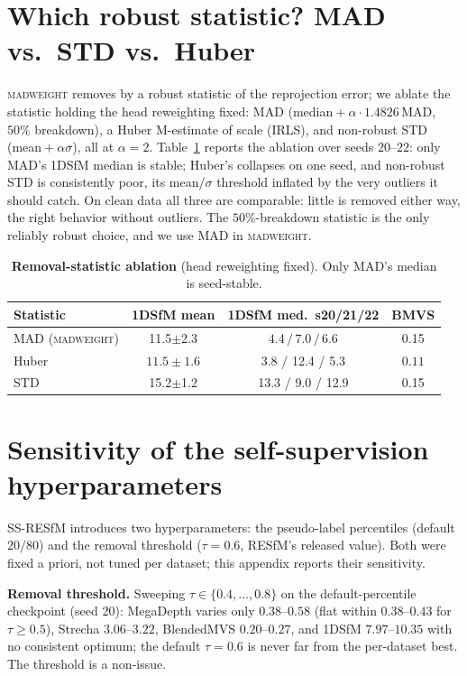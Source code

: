 \documentclass[10pt,twocolumn,letterpaper]{article}
\newcommand{\mad}{\textsc{madweight}}
\begin{document}
\section{Which robust statistic? MAD vs.\ STD vs.\ Huber}\label{app:stat}
\mad{} removes by a robust statistic of the reprojection error; we ablate the statistic
holding the head reweighting fixed: MAD (median${}+\alpha\cdot1.4826\,$MAD, $50\%$
breakdown), a Huber M-estimate of scale (IRLS), and non-robust STD
(mean${}+\alpha\sigma$), all at $\alpha{=}2$. Table~\ref{tab:madstat} reports the
ablation over seeds $20$--$22$: only MAD's 1DSfM median is stable; Huber's collapses on
one seed, and non-robust STD is consistently poor, its mean/$\sigma$ threshold inflated
by the very outliers it should catch. On clean data all three are comparable: little is
removed either way, the right behavior without outliers. The $50\%$-breakdown statistic
is the only reliably robust choice, and we use MAD in \mad{}.

\begin{table}[t]\centering\scriptsize
\setlength{\tabcolsep}{2.5pt}%
\caption{\textbf{Removal-statistic ablation} (head reweighting fixed). Only MAD's
median is seed-stable.}
\label{tab:madstat}
\begin{tabular}{lccc}
\toprule
Statistic & 1DSfM mean & 1DSfM med.\ s20/21/22 & BMVS\\
\midrule
MAD (\mad{}) & 11.5$\pm$2.3 & $\mathbf{4.4\,/\,7.0\,/\,6.6}$ & 0.15\\
Huber & $\mathbf{11.5\pm 1.6}$ & 3.8 / 12.4 / 5.3 & $\mathbf{0.11}$\\
STD & 15.2$\pm$1.2 & 13.3 / 9.0 / 12.9 & 0.15\\
\bottomrule
\end{tabular}
\end{table}



\section{Sensitivity of the self-supervision hyperparameters}\label{app:hyper}
SS-RESfM introduces two hyperparameters: the pseudo-label percentiles (default
$20/80$) and the removal threshold ($\tau{=}0.6$, RESfM's released value). Both were
fixed a priori, not tuned per dataset; this appendix reports their sensitivity.

\noindent\textbf{Removal threshold.} Sweeping $\tau\in\{0.4,\dots,0.8\}$ on the
default-percentile checkpoint (seed 20): MegaDepth varies only $0.38$--$0.58$
(flat within $0.38$--$0.43$ for $\tau\ge0.5$), Strecha $3.06$--$3.22$, BlendedMVS
$0.20$--$0.27$, and 1DSfM $7.97$--$10.35$ with no consistent optimum; the default
$\tau{=}0.6$ is never far from the per-dataset best. The threshold is a non-issue.
\end{document}
